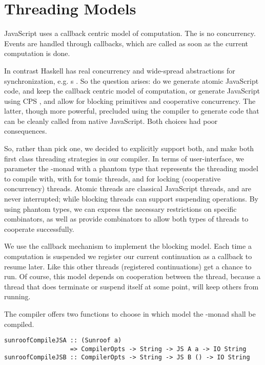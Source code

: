  
\section{Threading Models}
\label{sec:threading-models}

JavaScript uses a callback centric model of computation. The 
is no concurrency. Events are handled through callbacks,
which are called as soon as the current computation is done.

In contrast Haskell has real concurrency and wide-spread 
abstractions for synchronization, e.g. s .
So the question arises: do we generate atomic JavaScript code, 
and keep the callback centric model of computation, or generate JavaScript
using CPS \cite{Claessen:99:PoorMansConcurrencyMonad}, 
and allow for blocking primitives and
cooperative concurrency. The latter, though more powerful, 
precluded using the compiler to generate
code that can be cleanly called from native JavaScript.
Both choices had poor consequences.

So, rather than pick one, we decided to explicitly support both,
and make both first class threading strategies in our compiler.
In terms of user-interface, we parameter the \JS-monad
with a phantom type that represents the threading model
to compile with, with  for tomic threads,
and  for locking (cooperative concurrency) threads. 
Atomic threads are classical JavaScript threads, and
are never interrupted; while blocking threads can
support suspending operations. By using phantom
types, we can express the necessary
restrictions on specific combinators, as well
as provide combinators to allow both types of
threads to cooperate successfully.

We use the callback mechanism to implement the blocking model.
Each time a computation is suspended we register our current
continuation as a callback to resume later. Like this other 
threads (registered continuations) get a chance to run.
Of course, this model depends on cooperation between the thread,
because a thread that does terminate or suspend itself at some
point, will keep others from running.

The compiler offers two functions to choose in which
model the \JS-monad shall be compiled.
\begin{verbatim}
sunroofCompileJSA :: (Sunroof a) 
                  => CompilerOpts -> String -> JS A a -> IO String
sunroofCompileJSB :: CompilerOpts -> String -> JS B () -> IO String
\end{verbatim}

